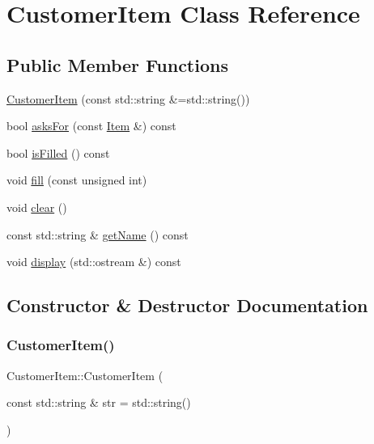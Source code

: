 \hypertarget{classCustomerItem}{}\section{Customer\+Item Class Reference}
\label{classCustomerItem}
\subsection*{Public Member Functions}
\begin{DoxyCompactItemize}
\item 
\mbox{\hyperlink{classCustomerItem_a7868c9be14aced9e5e6f657a0e5671fc}{Customer\+Item}} (const std\+::string \&=std\+::string())
\item 
bool \mbox{\hyperlink{classCustomerItem_a6275dac4b75e3cd8e56f504140cd135d}{asks\+For}} (const \mbox{\hyperlink{classItem}{Item}} \&) const
\item 
bool \mbox{\hyperlink{classCustomerItem_a39f6b78f595b7d4a20f1e7f945834335}{is\+Filled}} () const
\item 
void \mbox{\hyperlink{classCustomerItem_a31c01c091f1ebc623a66d80235bc5e8c}{fill}} (const unsigned int)
\item 
void \mbox{\hyperlink{classCustomerItem_af6a25490940dcac3842f877ea0da4580}{clear}} ()
\item 
const std\+::string \& \mbox{\hyperlink{classCustomerItem_a7922e8405fdcfff7ca45decd2a54efdc}{get\+Name}} () const
\item 
void \mbox{\hyperlink{classCustomerItem_a2aaa8551a3662bb4b2953704580fc408}{display}} (std\+::ostream \&) const
\end{DoxyCompactItemize}


\subsection{Constructor \& Destructor Documentation}
\mbox{\label{classCustomerItem_a7868c9be14aced9e5e6f657a0e5671fc}} 
\subsubsection{\texorpdfstring{Customer\+Item()}{CustomerItem()}}
{\footnotesize\ttfamily Customer\+Item\+::\+Customer\+Item (\begin{DoxyParamCaption}\item[{const std\+::string \&}]{str = {\ttfamily std\+:\+:string()} }\end{DoxyParamCaption})}

